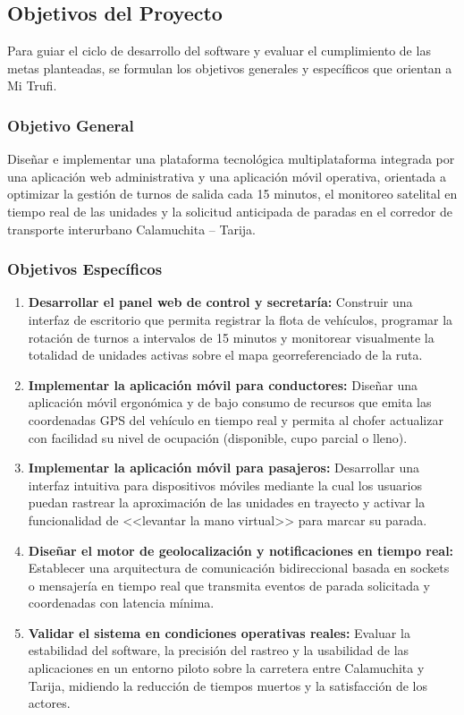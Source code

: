 \subsection{Objetivos del Proyecto}

Para guiar el ciclo de desarrollo del software y evaluar el cumplimiento de las metas planteadas, se formulan los objetivos generales y específicos que orientan a Mi Trufi.

\subsubsection{Objetivo General}

Diseñar e implementar una plataforma tecnológica multiplataforma integrada por una aplicación web administrativa y una aplicación móvil operativa, orientada a optimizar la gestión de turnos de salida cada 15 minutos, el monitoreo satelital en tiempo real de las unidades y la solicitud anticipada de paradas en el corredor de transporte interurbano Calamuchita -- Tarija.

\subsubsection{Objetivos Específicos}

\begin{enumerate}[label=\arabic*.]
    \item \textbf{Desarrollar el panel web de control y secretaría:} Construir una interfaz de escritorio que permita registrar la flota de vehículos, programar la rotación de turnos a intervalos de 15 minutos y monitorear visualmente la totalidad de unidades activas sobre el mapa georreferenciado de la ruta.
    \item \textbf{Implementar la aplicación móvil para conductores:} Diseñar una aplicación móvil ergonómica y de bajo consumo de recursos que emita las coordenadas GPS del vehículo en tiempo real y permita al chofer actualizar con facilidad su nivel de ocupación (disponible, cupo parcial o lleno).
    \item \textbf{Implementar la aplicación móvil para pasajeros:} Desarrollar una interfaz intuitiva para dispositivos móviles mediante la cual los usuarios puedan rastrear la aproximación de las unidades en trayecto y activar la funcionalidad de <<levantar la mano virtual>> para marcar su parada.
    \item \textbf{Diseñar el motor de geolocalización y notificaciones en tiempo real:} Establecer una arquitectura de comunicación bidireccional basada en sockets o mensajería en tiempo real que transmita eventos de parada solicitada y coordenadas con latencia mínima.
    \item \textbf{Validar el sistema en condiciones operativas reales:} Evaluar la estabilidad del software, la precisión del rastreo y la usabilidad de las aplicaciones en un entorno piloto sobre la carretera entre Calamuchita y Tarija, midiendo la reducción de tiempos muertos y la satisfacción de los actores.
\end{enumerate}
